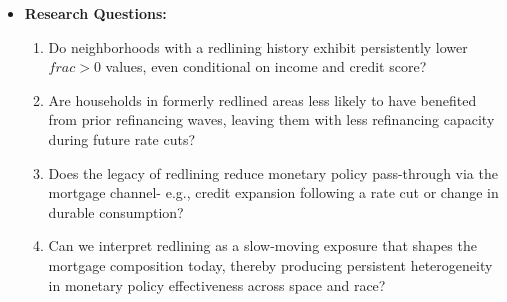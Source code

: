 \documentclass[10pt]{article}
\begin{document}
\begin{itemize}
\item \textbf{Research Questions:}
\begin{enumerate}
    \item Do neighborhoods with a redlining history exhibit persistently lower $frac > 0$ values, even conditional on income and credit score?
    \item Are households in formerly redlined areas less likely to have benefited from prior refinancing waves, leaving them with less refinancing capacity during future rate cuts?
    \item Does the legacy of redlining reduce monetary policy pass-through via the mortgage channel- e.g., credit expansion following a rate cut or change in durable consumption?
    \item Can we interpret redlining as a slow-moving exposure that shapes the mortgage composition today, thereby producing persistent heterogeneity in monetary policy effectiveness across space and race?
\end{enumerate}


\end{itemize}
\end{document}
